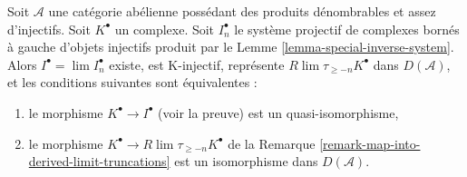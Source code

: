 \begin{lemma}
\label{lemma-difficulty-K-injectives}
Soit $\mathcal{A}$ une catégorie abélienne possédant des produits dénombrables
et assez d'injectifs. Soit $K^\bullet$ un complexe. Soit $I_n^\bullet$ le
système projectif de complexes bornés à gauche d'objets injectifs produit par
le Lemme \ref{lemma-special-inverse-system}. Alors
$I^\bullet = \lim I_n^\bullet$ existe, est K-injectif, représente
$R\lim \tau_{\geq -n}K^\bullet$ dans $D(\mathcal{A})$, et les conditions
suivantes sont équivalentes :
\begin{enumerate}
\item le morphisme $K^\bullet \to I^\bullet$ (voir la preuve) est un
quasi-isomorphisme,
\item le morphisme $K^\bullet \to R\lim \tau_{\geq -n}K^\bullet$ de la
Remarque \ref{remark-map-into-derived-limit-truncations} est un isomorphisme
dans $D(\mathcal{A})$.
\end{enumerate}
\end{lemma}


